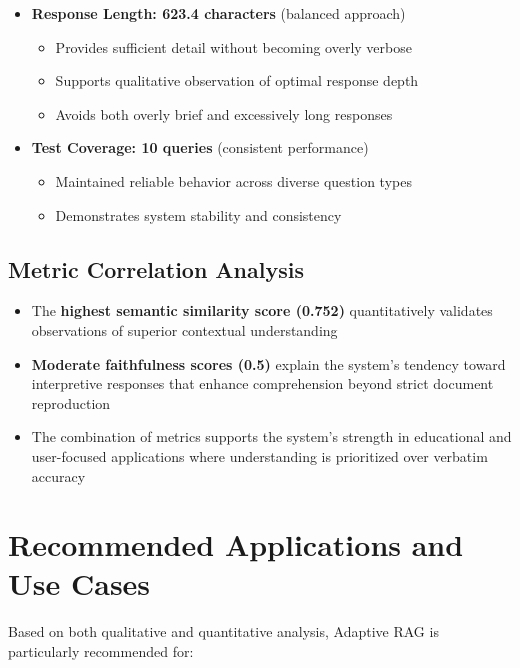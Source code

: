 \documentclass[12pt,a4paper]{article}
\begin{document}
\begin{itemize}
    \item \textbf{Response Length: 623.4 characters} (balanced approach)
    \begin{itemize}
        \item Provides sufficient detail without becoming overly verbose
        \item Supports qualitative observation of optimal response depth
        \item Avoids both overly brief and excessively long responses
    \end{itemize}
    
    \item \textbf{Test Coverage: 10 queries} (consistent performance)
    \begin{itemize}
        \item Maintained reliable behavior across diverse question types
        \item Demonstrates system stability and consistency
    \end{itemize}
\end{itemize}

\subsection{Metric Correlation Analysis}

\begin{itemize}
    \item The \textbf{highest semantic similarity score (0.752)} quantitatively validates observations of superior contextual understanding
    \item \textbf{Moderate faithfulness scores (0.5)} explain the system's tendency toward interpretive responses that enhance comprehension beyond strict document reproduction
    \item The combination of metrics supports the system's strength in educational and user-focused applications where understanding is prioritized over verbatim accuracy
\end{itemize}

\section{Recommended Applications and Use Cases}

Based on both qualitative and quantitative analysis, Adaptive RAG is particularly recommended for:
\end{document}
